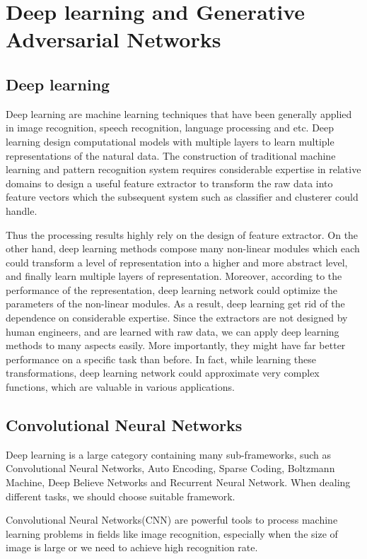 
\chapter{Deep learning and Generative Adversarial Networks}



\section{Deep learning}
Deep learning are machine learning techniques that have been generally applied in image recognition, speech recognition, language processing and etc. Deep learning design computational models with multiple layers to learn multiple representations of the natural data. The construction of traditional machine learning and pattern recognition system requires considerable expertise in relative domains to design a useful feature extractor to transform the raw data into feature vectors which the subsequent system such as classifier and clusterer could handle.

Thus the processing results highly rely on the design of feature extractor. On the other hand, deep learning methods compose many non-linear modules which each could transform a level of representation into a higher and more abstract level, and finally learn multiple layers of representation. Moreover, according to the performance of the representation, deep learning network could optimize the parameters of the non-linear modules. As a result, deep learning get rid of the dependence on considerable expertise. Since the extractors are not designed by human engineers, and are learned with raw data, we can apply deep learning methods to many aspects easily. More importantly, they might have far better performance on a specific task than before. In fact, while learning these transformations, deep learning network could approximate very complex functions, which are valuable in various applications.


\section{Convolutional Neural Networks}
Deep learning is a large category containing many sub-frameworks, such as Convolutional Neural Networks, Auto Encoding, Sparse Coding, Boltzmann Machine, Deep Believe Networks and Recurrent Neural Network. When dealing different tasks, we should choose suitable framework.

Convolutional Neural Networks(CNN) are powerful tools to process machine learning problems in fields like image recognition, especially when the size of image is large or we need to achieve high recognition rate.

